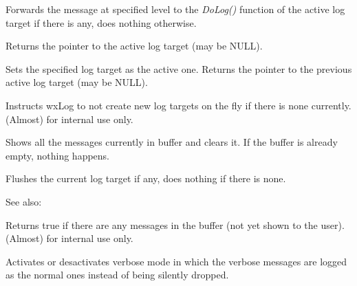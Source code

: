 Forwards the message at specified level to the {\it DoLog()} function of the
active log target if there is any, does nothing otherwise.

\label{wxloggetactivetarget}


Returns the pointer to the active log target (may be NULL).

\label{wxlogsetactivetarget}


Sets the specified log target as the active one. Returns the pointer to the
previous active log target (may be NULL).

\label{wxlogdontcreateondemand}


Instructs wxLog to not create new log targets on the fly if there is none
currently. (Almost) for internal use only.

\label{wxlogflush}


Shows all the messages currently in buffer and clears it. If the buffer
is already empty, nothing happens.

\label{wxlogflushactive}


Flushes the current log target if any, does nothing if there is none.

See also:


\label{haspendingmessages}


Returns true if there are any messages in the buffer (not yet shown to the
user). (Almost) for internal use only.

\label{wxlogsetverbose}


Activates or desactivates verbose mode in which the verbose messages are
logged as the normal ones instead of being silently dropped.

